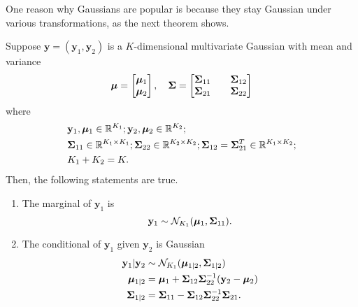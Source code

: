 One reason why Gaussians are popular is because they stay Gaussian under various transformations, as the next theorem shows.

\begin{theorem}\label{thm:ogag}
    Suppose $\mathbf{y} = (\mathbf{y}_1, \mathbf{y}_2)$ is a $K$-dimensional multivariate Gaussian with mean and variance
    \begin{equation*}
        \boldsymbol{\mu} =
        \begin{bmatrix}
            \boldsymbol{\mu}_1 \\
            \boldsymbol{\mu}_2
        \end{bmatrix}
        ,\quad
        \boldsymbol{\Sigma} =
        \begin{bmatrix}
            \boldsymbol{\Sigma}_{11} &  & \boldsymbol{\Sigma}_{12} \\
            \boldsymbol{\Sigma}_{21} &  & \boldsymbol{\Sigma}_{22} \\
        \end{bmatrix}
    \end{equation*}
    where
    \begin{align*}
        &\mathbf{y}_1, \boldsymbol{\mu}_1 \in \mathbb{R}^{K_1};
        \mathbf{y}_2, \boldsymbol{\mu}_2 \in \mathbb{R}^{K_2}; \\
        &\boldsymbol{\Sigma}_{11} \in \mathbb{R}^{K_1 \times K_1};
        \boldsymbol{\Sigma}_{22} \in \mathbb{R}^{K_2 \times K_2};
        \boldsymbol{\Sigma}_{12} = \boldsymbol{\Sigma}_{21}^{T} \in \mathbb{R}^{K_1 \times K_2}; \\
        &K_1 + K_2 = K.
    \end{align*}
    Then, the following statements are true.
    \begin{enumerate}
        \item
            The marginal of $\mathbf{y}_1$ is
            \begin{equation*}
                \mathbf{y}_{1} \sim \mathcal{N}_{K_1}(\boldsymbol{\mu}_1, \boldsymbol{\Sigma}_{11}).
            \end{equation*}

        \item
            The conditional of $\mathbf{y}_1$ given $\mathbf{y}_2$ is Gaussian
            \begin{align*}
                \mathbf{y}_1 | \mathbf{y}_2 & \sim \mathcal{N}_{K_1}(\boldsymbol{\mu}_{1 | 2}, \boldsymbol{\Sigma}_{1 | 2}) \\
                \boldsymbol{\mu}_{1 | 2} & = \boldsymbol{\mu}_1 + \boldsymbol{\Sigma}_{12} \boldsymbol{\Sigma}_{22}^{-1} (\mathbf{y}_2 - \boldsymbol{\mu}_2) \\
                \boldsymbol{\Sigma}_{1|2 } & = \boldsymbol{\Sigma}_{11} - \boldsymbol{\Sigma}_{12} \boldsymbol{\Sigma}_{22}^{-1} \boldsymbol{\Sigma}_{21}.
            \end{align*}


\end{enumerate}
\end{theorem}
